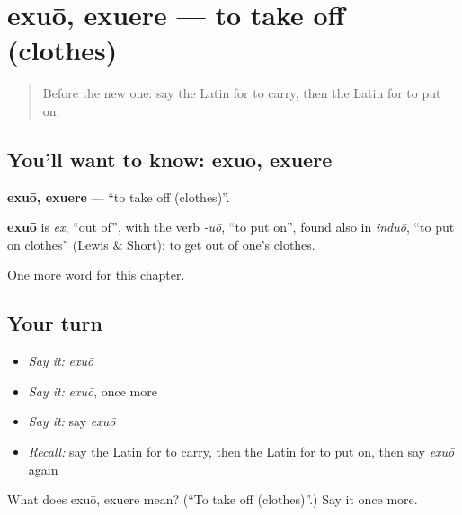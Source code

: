 \section[exuō, exuere]{exuō, exuere — to take off (clothes)}

\label{lesson:LA-C155-exuo}



\begin{quote}
Before the new one: say the Latin for to carry, then the Latin for to put on.
\end{quote}

\subsection*{You'll want to know: exuō, exuere}
\textbf{exuō, exuere} — \textquotedblleft{}to take off (clothes)\textquotedblright{}.

\begin{cousinweb}
\textbf{exuō} is \emph{ex}, \textquotedblleft{}out of\textquotedblright{}, with the verb \emph{-uō}, \textquotedblleft{}to put on\textquotedblright{}, found also in \emph{induō}, \textquotedblleft{}to put on clothes\textquotedblright{} (Lewis \& Short): to get out of one's clothes.
\end{cousinweb}

\begin{grammarlens}[title={What you've built}]
One more word for this chapter.
\end{grammarlens}

\subsection*{Your turn}
\begin{itemize}
\raggedright
  \item \emph{Say it:} \emph{exuō}
  \item \emph{Say it:} \emph{exuō}, once more
  \item \emph{Say it:} say \emph{exuō}
  \item \emph{Recall:} say the Latin for to carry, then the Latin for to put on, then say \emph{exuō} again
\end{itemize}

\begin{tcolorbox}[breakable,colback=teal!4,colframe=teal!35!black,title={Before you move on}]
What does exuō, exuere mean? (\textquotedblleft{}To take off (clothes)\textquotedblright{}.) Say it once more.
\end{tcolorbox}
